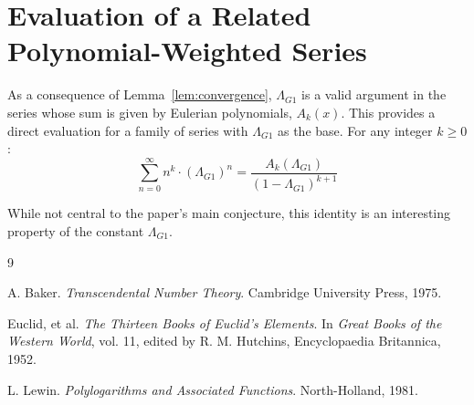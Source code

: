 \documentclass{amsart}
\theoremstyle{plain}
\theoremstyle{definition}
\theoremstyle{remark}
\newcommand{\LambdaG}{\Lambda_{G1}}
\begin{document}
\section{Evaluation of a Related Polynomial-Weighted Series}
As a consequence of Lemma~\ref{lem:convergence}, $\LambdaG$ is a valid argument in the series whose sum is given by Eulerian polynomials, $A_k(x)$.
This provides a direct evaluation for a family of series with $\LambdaG$ as the base.
For any integer $k \ge 0$:
$$ \sum_{n=0}^{\infty} n^k \cdot (\LambdaG)^n = \frac{A_k(\LambdaG)}{(1-\LambdaG)^{k+1}} $$

While not central to the paper's main conjecture, this identity is an interesting property of the constant $\LambdaG$.

\begin{thebibliography}{9}

A. Baker. \textit{Transcendental Number Theory}. Cambridge University Press, 1975.

Euclid, et al. \textit{The Thirteen Books of Euclid's Elements}. In \textit{Great Books of the Western World}, vol. 11, edited by R. M. Hutchins, Encyclopaedia Britannica, 1952. 

L. Lewin. \textit{Polylogarithms and Associated Functions}. North-Holland, 1981.

\end{thebibliography}
\end{document}
